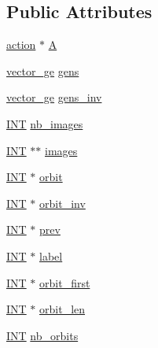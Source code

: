 \subsection*{Public Attributes}
\begin{DoxyCompactItemize}
\item 
\mbox{\hyperlink{classaction}{action}} $\ast$ \mbox{\hyperlink{classschreier_a1a33e8aaeb25635fbb26da7730bff499}{A}}
\item 
\mbox{\hyperlink{classvector__ge}{vector\+\_\+ge}} \mbox{\hyperlink{classschreier_af3dfc4e56f55faa3981755aec24bde82}{gens}}
\item 
\mbox{\hyperlink{classvector__ge}{vector\+\_\+ge}} \mbox{\hyperlink{classschreier_afeb872288b800fb77995b615ffb2d394}{gens\+\_\+inv}}
\item 
\mbox{\hyperlink{galois_8h_a09fddde158a3a20bd2dcadb609de11dc}{I\+NT}} \mbox{\hyperlink{classschreier_a3bf9949b18b9c360998bdd75beff2cd9}{nb\+\_\+images}}
\item 
\mbox{\hyperlink{galois_8h_a09fddde158a3a20bd2dcadb609de11dc}{I\+NT}} $\ast$$\ast$ \mbox{\hyperlink{classschreier_a8741aef0bd0b09a1345d885ceaccce04}{images}}
\item 
\mbox{\hyperlink{galois_8h_a09fddde158a3a20bd2dcadb609de11dc}{I\+NT}} $\ast$ \mbox{\hyperlink{classschreier_a642c5b67e7646e34c88149f32f0db815}{orbit}}
\item 
\mbox{\hyperlink{galois_8h_a09fddde158a3a20bd2dcadb609de11dc}{I\+NT}} $\ast$ \mbox{\hyperlink{classschreier_a4bc82f7c547fc02d90d63cedbe5f0a80}{orbit\+\_\+inv}}
\item 
\mbox{\hyperlink{galois_8h_a09fddde158a3a20bd2dcadb609de11dc}{I\+NT}} $\ast$ \mbox{\hyperlink{classschreier_ae542cd9edea071ce80c57b3d1eff42d2}{prev}}
\item 
\mbox{\hyperlink{galois_8h_a09fddde158a3a20bd2dcadb609de11dc}{I\+NT}} $\ast$ \mbox{\hyperlink{classschreier_a88c4f6950e428de464f0f3e6531dbef3}{label}}
\item 
\mbox{\hyperlink{galois_8h_a09fddde158a3a20bd2dcadb609de11dc}{I\+NT}} $\ast$ \mbox{\hyperlink{classschreier_a36ed672dc0071102b40cf49af1a05935}{orbit\+\_\+first}}
\item 
\mbox{\hyperlink{galois_8h_a09fddde158a3a20bd2dcadb609de11dc}{I\+NT}} $\ast$ \mbox{\hyperlink{classschreier_a7561d8c36ffe1500ae72101a6fd4736a}{orbit\+\_\+len}}
\item 
\mbox{\hyperlink{galois_8h_a09fddde158a3a20bd2dcadb609de11dc}{I\+NT}} \mbox{\hyperlink{classschreier_a1a901de868e1e501316598841732b238}{nb\+\_\+orbits}}
\item 
$$
\end{DoxyCompactItemize}
